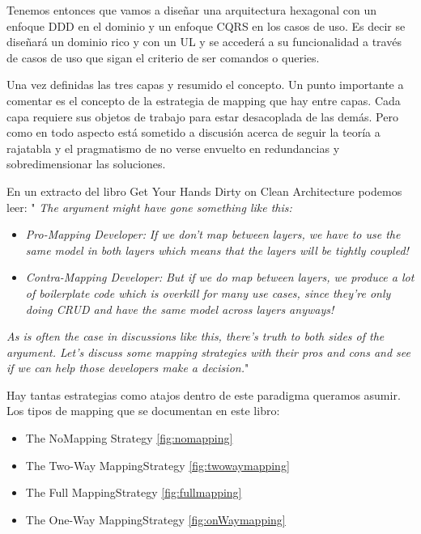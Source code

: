 Tenemos entonces que vamos a diseñar una arquitectura hexagonal con un enfoque DDD en el dominio y un enfoque CQRS en los casos de uso. Es decir se diseñará un dominio rico y con un UL y se accederá a su funcionalidad a través de casos de uso que sigan el criterio de ser comandos o queries.

Una vez definidas las tres capas y resumido el concepto. Un punto importante a comentar es el concepto de la estrategia de mapping que hay entre capas. Cada capa requiere sus objetos de trabajo para estar desacoplada de las demás. Pero como en todo aspecto está sometido a discusión acerca de seguir la teoría a rajatabla y el pragmatismo de no verse envuelto en redundancias y sobredimensionar las soluciones.

En un extracto del libro Get Your Hands Dirty on Clean Architecture\cite{TomHombergs2019GYHD} podemos leer:
"\textit{ The argument might have gone something like this:}

\begin{itemize}
    \item \textit{Pro-Mapping Developer:}
    \subitem  \textit{ If we don’t map between layers, we have to use the same model in both layers which means that the layers will be tightly coupled!}
    \item \textit{Contra-Mapping Developer:}
    \subitem \textit{ But if we do map between layers, we produce a lot of boilerplate code which is overkill for many use cases, since they’re only doing CRUD and have the same model across layers anyways!}
\end{itemize}
\textit{As is often the case in discussions like this, there’s truth to both sides of the argument. Let’s discuss some mapping strategies with their pros and cons and see if we can help those developers make a decision.}"

Hay tantas estrategias como atajos dentro de este paradigma queramos asumir. Los tipos de mapping que se documentan en este libro:

\begin{itemize}
    \item The NoMapping Strategy \ref{fig:nomapping}
    \item The Two-Way MappingStrategy \ref{fig:twowaymapping}
    \item The Full MappingStrategy \ref{fig:fullmapping}
    \item The One-Way MappingStrategy \ref{fig:onWaymapping}
\end{itemize}

